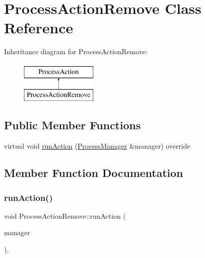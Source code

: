 \hypertarget{classProcessActionRemove}{}\section{Process\+Action\+Remove Class Reference}
\label{classProcessActionRemove}
Inheritance diagram for Process\+Action\+Remove\+:\begin{figure}[H]
\begin{center}
\leavevmode
\includegraphics[height=2.000000cm]{classProcessActionRemove}
\end{center}
\end{figure}
\subsection*{Public Member Functions}
\begin{DoxyCompactItemize}
\item 
virtual void \hyperlink{classProcessActionRemove_ac673f99819ee50b724277f02005f3f39}{run\+Action} (\hyperlink{classProcessManager}{Process\+Manager} \&manager) override
\end{DoxyCompactItemize}


\subsection{Member Function Documentation}
\mbox{\label{classProcessActionRemove_ac673f99819ee50b724277f02005f3f39}} 
\subsubsection{\texorpdfstring{run\+Action()}{runAction()}}
{\footnotesize\ttfamily void Process\+Action\+Remove\+::run\+Action (\begin{DoxyParamCaption}\item[{\hyperlink{classProcessManager}{Process\+Manager} \&}]{manager }\end{DoxyParamCaption})\hspace{0.3cm}{\ttfamily [override]}, {\ttfamily [virtual]}}

